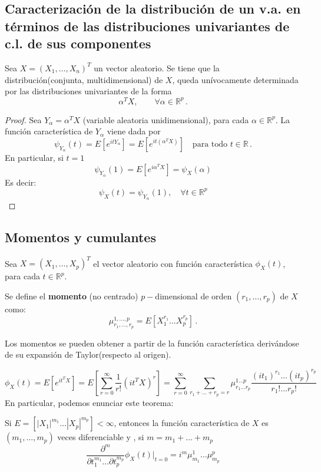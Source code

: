 \subsection{Caracterización de la distribución de un v.a. en términos de las distribuciones univariantes de c.l. de sus componentes}

\begin{nth}
  Sea $X = (X_1,\dots, X_n)^T$ un vector aleatorio. Se tiene que la distribución(conjunta, multidimensional) de $X$, queda unívocamente determinada por las distribuciones univariantes de la forma
  \[
\alpha ^T X, \quad \quad \forall \alpha \in \mathbb R ^p\,.
  \]
\end{nth}
\begin{proof}
  Sea $Y_\alpha = \alpha^T X$ (variable aleatoria unidimensional), para cada $\alpha \in \mathbb R^p$. La función característica de $Y_\alpha$ viene dada por
  \[
  \psi_{Y_\alpha}(t) = E\left[e^{itY_\alpha}\right] = E \left[e^{it(\alpha^T X)}\right] \quad \text{para todo } t \in \mathbb R\,.
  \]
  En particular, si $t=1$
  \[
  \psi_{Y_\alpha}(1) = E\left[e^{i\alpha^T X}\right] = \psi_X (\alpha)
  \]
  Es decir:
  \[
  \psi_X(t) = \psi_{Y_\alpha}(1), \quad \forall t \in \mathbb R ^p
  \]
\end{proof}

\subsection{Momentos y cumulantes}

Sea $X= (X_1,\dots,X_p)^T$ el vector aleatorio con función característica $\phi_X(t)$, para cada $t\in \mathbb R^p$.
\begin{ndef}
  Se define el \textbf{momento} (no centrado) $p-$dimensional de orden $(r_1, \dots, r_p)$ de $X$ como:
  \[
\mu_{r_1,\dots,r_p}^{1,\dots,p} = E [ X_1^{r_1} \dots X_p^{r_p}]\,.
  \]
\end{ndef}

Los momentos se pueden obtener a partir de la función característica derivándose de su expansión de Taylor(respecto al origen).

\[
\phi_X(t) = E[e^{it^T X}] = E[\sum_{r=0}^\infty \frac{1}{r!}(i t^T X)^r] = \sum_{r= 0}^\infty \sum _{r_1+\dots + r_p = r} \mu_{r_1 \dots r_p}^{1 \dots p} \frac{(it_1)^{r_1} \dots (it_p)^{r_p}}{r_1 ! \dots r_p !}
\]
En particular, podemos enunciar este teorema:
\begin{nth}
  Si $E=[|X_1|^{m_1} \dots |X_p|^{m_p}] < \infty$, entonces la función característica de $X$ es $(m_1, \dots, m_p)$ veces diferenciable y , si $m = m_1 + \dots + m_p$
  \[
\frac{\partial ^m}{\partial t_1^{m_1} \dots \partial t_p^{m_p}} \phi_X(t)| _{t = 0} = i^m \mu_{m_1}^1 \dots \mu_{m_p}^p
  \]
\end{nth}

